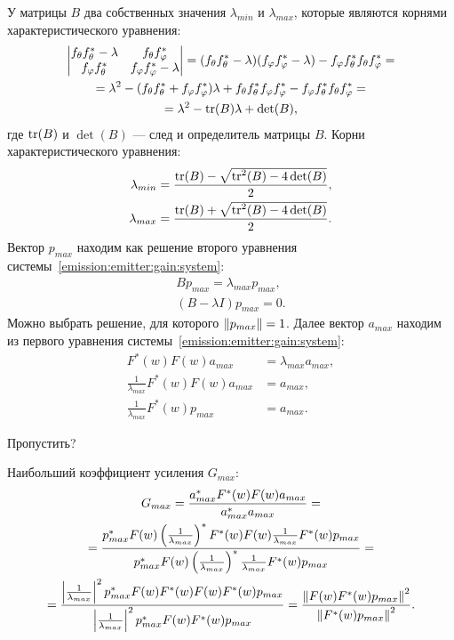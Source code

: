 У матрицы $B$ два собственных значения $\lambda_{min}$ и $\lambda_{max}$, которые являются корнями характеристического уравнения:
\begin{multline*}
    \begin{vmatrix}
        f_\theta f_\theta^* - \lambda & f_{\theta} f_\varphi^*          \\
        f_\varphi f_\theta^*          & f_\varphi f_\varphi^* - \lambda
    \end{vmatrix}
    = (f_\theta f_\theta^* - \lambda) (f_\varphi f_\varphi^* - \lambda) - f_\varphi f_\theta^* f_{\theta} f_\varphi^* = \\
%
    = \lambda^2 - ( f_\theta f_\theta^* + f_\varphi f_\varphi^* ) \lambda + f_\theta f_\theta^* f_\varphi f_\varphi^* - f_\varphi f_\theta^* f_{\theta} f_\varphi^* = \\
%
    = \lambda^2 - \tr(B) \lambda + \det(B) ,
\end{multline*}
где $\operatorname{tr}(B)$ и $\det(B)$ --- след и определитель матрицы $B$. Корни характеристического уравнения:
\begin{align}
    \lambda_{min} & = \frac{\operatorname{tr}(B) - \sqrt{\operatorname{tr}^2(B) - 4 \det(B)}}{2} \label{emission:emitter:gain:minimum_eigenvalue} , \\
    \lambda_{max} & = \frac{\operatorname{tr}(B) + \sqrt{\operatorname{tr}^2(B) - 4 \det(B)}}{2} \label{emission:emitter:gain:maximum_eigenvalue}.
\end{align}
Вектор $p_{max}$ находим как решение второго уравнения системы~\eqref{emission:emitter:gain:system}:
\begin{gather*}
    B p_{max} = \lambda_{max} p_{max} , \\
    ( B - \lambda I ) p_{max} = 0 .
\end{gather*}
Можно выбрать решение, для которого $\left \| p_{max} \right \| = 1$. Далее вектор $a_{max}$ находим из первого уравнения системы~\eqref{emission:emitter:gain:system}:
\begin{align*}
    F^*(w) F(w) a_{max}                         & = \lambda_{max} a_{max} , \\
    \frac{1}{\lambda_{max}} F^*(w) F(w) a_{max} & = a_{max} , \\
    \frac{1}{\lambda_{max}} F^*(w) p_{max}      & = a_{max} .
\end{align*}
{
    \color{red}
    Пропустить?

    Наибольший коэффициент усиления $G_{max}$:
    \begin{multline*}
        G_{max}
        = \frac{a_{max}^* F^*(w) F(w) a_{max}}{a_{max}^* a_{max}} = \\
%
        = \frac{p_{max}^* F(w) \left ( \frac{1}{\lambda_{max}} \right )^* F^*(w) F(w) \frac{1}{\lambda_{max}} F^*(w) p_{max}}{ p_{max}^* F(w) \left ( \frac{1}{\lambda_{max}} \right )^* \frac{1}{\lambda_{max}} F^*(w) p_{max}} = \\
%
        = \frac{\modulus{\frac{1}{\lambda_{max}}}^2 p_{max}^* F(w) F^*(w) F(w) F^*(w) p_{max}}{ \modulus{\frac{1}{\lambda_{max}}}^2 p_{max}^* F(w) F^*(w) p_{max}}
        = \frac{\norm{F(w) F^*(w) p_{max}}^2}{ \norm{F^*(w) p_{max}}^2} .
    \end{multline*}
}

